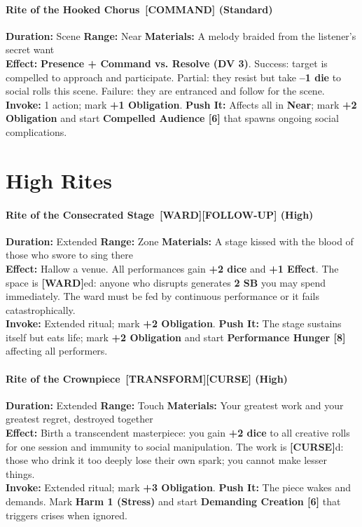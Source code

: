 \paragraph{\textbf{Rite of the Hooked Chorus \,[COMMAND] (Standard)}} 
\textbf{Duration:} Scene \quad \textbf{Range:} Near \quad \textbf{Materials:} A melody braided from the listener's secret want \\
\textbf{Effect:} \textbf{Presence + Command vs. Resolve (DV 3)}. Success: target is compelled to approach and participate. Partial: they resist but take \textbf{--1 die} to social rolls this scene. Failure: they are entranced and follow for the scene. \\
\textbf{Invoke:} 1 action; mark \textbf{+1 Obligation}. \quad \textbf{Push It:} Affects all in \textbf{Near}; mark \textbf{+2 Obligation} and start \textbf{Compelled Audience [6]} that spawns ongoing social complications.

\section*{High Rites}
\label{sec:palinode-high}

\paragraph{\textbf{Rite of the Consecrated Stage \,[WARD][FOLLOW-UP] (High)}} 
\textbf{Duration:} Extended \quad \textbf{Range:} Zone \quad \textbf{Materials:} A stage kissed with the blood of those who swore to sing there \\
\textbf{Effect:} Hallow a venue. All performances gain \textbf{+2 dice} and \textbf{+1 Effect}. The space is \textbf{[WARD]}ed: anyone who disrupts generates \textbf{2 SB} you may spend immediately. The ward must be fed by continuous performance or it fails catastrophically. \\
\textbf{Invoke:} Extended ritual; mark \textbf{+2 Obligation}. \quad \textbf{Push It:} The stage sustains itself but eats life; mark \textbf{+2 Obligation} and start \textbf{Performance Hunger [8]} affecting all performers.

\paragraph{\textbf{Rite of the Crownpiece \,[TRANSFORM][CURSE] (High)}} 
\textbf{Duration:} Extended \quad \textbf{Range:} Touch \quad \textbf{Materials:} Your greatest work and your greatest regret, destroyed together \\
\textbf{Effect:} Birth a transcendent masterpiece: you gain \textbf{+2 dice} to all creative rolls for one session and immunity to social manipulation. The work is \textbf{[CURSE]}d: those who drink it too deeply lose their own spark; you cannot make lesser things. \\
\textbf{Invoke:} Extended ritual; mark \textbf{+3 Obligation}. \quad \textbf{Push It:} The piece wakes and demands. Mark \textbf{Harm 1 (Stress)} and start \textbf{Demanding Creation [6]} that triggers crises when ignored.

